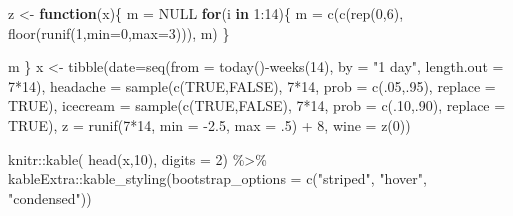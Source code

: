 \documentclass[
]{book}
\newenvironment{Shaded}{\begin{snugshade}}{\end{snugshade}}
\newcommand{\AttributeTok}[1]{\textcolor[rgb]{0.77,0.63,0.00}{#1}}
\newcommand{\ConstantTok}[1]{\textcolor[rgb]{0.00,0.00,0.00}{#1}}
\newcommand{\ControlFlowTok}[1]{\textcolor[rgb]{0.13,0.29,0.53}{\textbf{#1}}}
\newcommand{\DecValTok}[1]{\textcolor[rgb]{0.00,0.00,0.81}{#1}}
\newcommand{\FloatTok}[1]{\textcolor[rgb]{0.00,0.00,0.81}{#1}}
\newcommand{\FunctionTok}[1]{\textcolor[rgb]{0.00,0.00,0.00}{#1}}
\newcommand{\NormalTok}[1]{#1}
\newcommand{\OtherTok}[1]{\textcolor[rgb]{0.56,0.35,0.01}{#1}}
\newcommand{\SpecialCharTok}[1]{\textcolor[rgb]{0.00,0.00,0.00}{#1}}
\newcommand{\StringTok}[1]{\textcolor[rgb]{0.31,0.60,0.02}{#1}}
\begin{document}
\begin{Shaded}
\begin{Highlighting}[]
\NormalTok{z }\OtherTok{\textless{}{-}} \ControlFlowTok{function}\NormalTok{(x)\{}
\NormalTok{m }\OtherTok{=} \ConstantTok{NULL}
\ControlFlowTok{for}\NormalTok{(i }\ControlFlowTok{in} \DecValTok{1}\SpecialCharTok{:}\DecValTok{14}\NormalTok{)\{}
\NormalTok{  m }\OtherTok{=} \FunctionTok{c}\NormalTok{(}\FunctionTok{c}\NormalTok{(}\FunctionTok{rep}\NormalTok{(}\DecValTok{0}\NormalTok{,}\DecValTok{6}\NormalTok{),}
              \FunctionTok{floor}\NormalTok{(}\FunctionTok{runif}\NormalTok{(}\DecValTok{1}\NormalTok{,}\AttributeTok{min=}\DecValTok{0}\NormalTok{,}\AttributeTok{max=}\DecValTok{3}\NormalTok{))),}
\NormalTok{        m)}
\NormalTok{\}}

\NormalTok{m}
\NormalTok{\}}
\NormalTok{x }\OtherTok{\textless{}{-}} \FunctionTok{tibble}\NormalTok{(}\AttributeTok{date=}\FunctionTok{seq}\NormalTok{(}\AttributeTok{from =} \FunctionTok{today}\NormalTok{()}\SpecialCharTok{{-}}\FunctionTok{weeks}\NormalTok{(}\DecValTok{14}\NormalTok{),}
                     \AttributeTok{by =} \StringTok{"1 day"}\NormalTok{, }\AttributeTok{length.out =} \DecValTok{7}\SpecialCharTok{*}\DecValTok{14}\NormalTok{),}
            \AttributeTok{headache =} \FunctionTok{sample}\NormalTok{(}\FunctionTok{c}\NormalTok{(}\ConstantTok{TRUE}\NormalTok{,}\ConstantTok{FALSE}\NormalTok{), }\DecValTok{7}\SpecialCharTok{*}\DecValTok{14}\NormalTok{,}
                              \AttributeTok{prob =} \FunctionTok{c}\NormalTok{(.}\DecValTok{05}\NormalTok{,.}\DecValTok{95}\NormalTok{),}
                              \AttributeTok{replace =} \ConstantTok{TRUE}\NormalTok{),}
            \AttributeTok{icecream =} \FunctionTok{sample}\NormalTok{(}\FunctionTok{c}\NormalTok{(}\ConstantTok{TRUE}\NormalTok{,}\ConstantTok{FALSE}\NormalTok{), }\DecValTok{7}\SpecialCharTok{*}\DecValTok{14}\NormalTok{,}
                              \AttributeTok{prob =} \FunctionTok{c}\NormalTok{(.}\DecValTok{10}\NormalTok{,.}\DecValTok{90}\NormalTok{),}
                              \AttributeTok{replace =} \ConstantTok{TRUE}\NormalTok{),}
            \AttributeTok{z =} \FunctionTok{runif}\NormalTok{(}\DecValTok{7}\SpecialCharTok{*}\DecValTok{14}\NormalTok{, }\AttributeTok{min =} \SpecialCharTok{{-}}\FloatTok{2.5}\NormalTok{, }\AttributeTok{max =}\NormalTok{ .}\DecValTok{5}\NormalTok{) }\SpecialCharTok{+} \DecValTok{8}\NormalTok{,}
            \AttributeTok{wine =} \FunctionTok{z}\NormalTok{(}\DecValTok{0}\NormalTok{))}

\NormalTok{knitr}\SpecialCharTok{::}\FunctionTok{kable}\NormalTok{( }\FunctionTok{head}\NormalTok{(x,}\DecValTok{10}\NormalTok{), }\AttributeTok{digits =} \DecValTok{2}\NormalTok{) }\SpecialCharTok{\%\textgreater{}\%}
\NormalTok{  kableExtra}\SpecialCharTok{::}\FunctionTok{kable\_styling}\NormalTok{(}\AttributeTok{bootstrap\_options =} \FunctionTok{c}\NormalTok{(}\StringTok{"striped"}\NormalTok{, }\StringTok{"hover"}\NormalTok{, }\StringTok{"condensed"}\NormalTok{))}
\end{Highlighting}
\end{Shaded}
\end{document}
